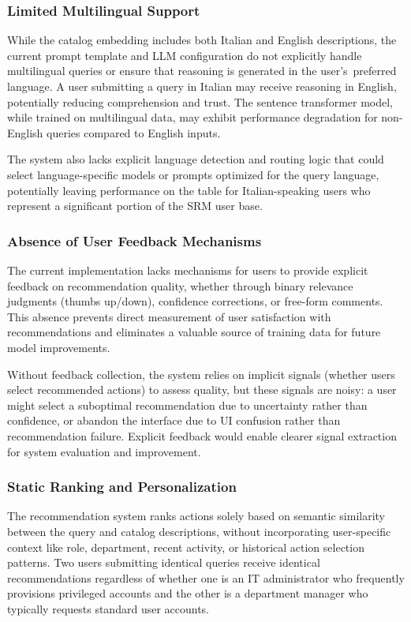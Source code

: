 \subsubsection{Limited Multilingual Support}

While the catalog embedding includes both Italian and English descriptions, the current prompt template and LLM configuration do not explicitly handle multilingual queries or ensure that reasoning is generated in the user's~preferred language. A user submitting a query in Italian may receive reasoning in English, potentially reducing comprehension and trust. The sentence transformer model, while trained on multilingual data, may exhibit performance degradation for non-English queries compared to English inputs.

The system also lacks explicit language detection and routing logic that could select language-specific models or prompts optimized for the query language, potentially leaving performance on the table for Italian-speaking users who represent a significant portion of the SRM user base.

\subsubsection{Absence of User Feedback Mechanisms}

The current implementation lacks mechanisms for users to provide explicit feedback on recommendation quality, whether through binary relevance judgments (thumbs up/down), confidence corrections, or free-form comments. This absence prevents direct measurement of user satisfaction with recommendations and eliminates a valuable source of training data for future model improvements.

Without feedback collection, the system relies on implicit signals (whether users select recommended actions) to assess quality, but these signals are noisy: a user might select a suboptimal recommendation due to uncertainty rather than confidence, or abandon the interface due to UI confusion rather than recommendation failure. Explicit feedback would enable clearer signal extraction for system evaluation and improvement.

\subsubsection{Static Ranking and Personalization}

The recommendation system ranks actions solely based on semantic similarity between the query and catalog descriptions, without incorporating user-specific context like role, department, recent activity, or historical action selection patterns. Two users submitting identical queries receive identical recommendations regardless of whether one is an IT administrator who frequently provisions privileged accounts and the other is a department manager who typically requests standard user accounts.

